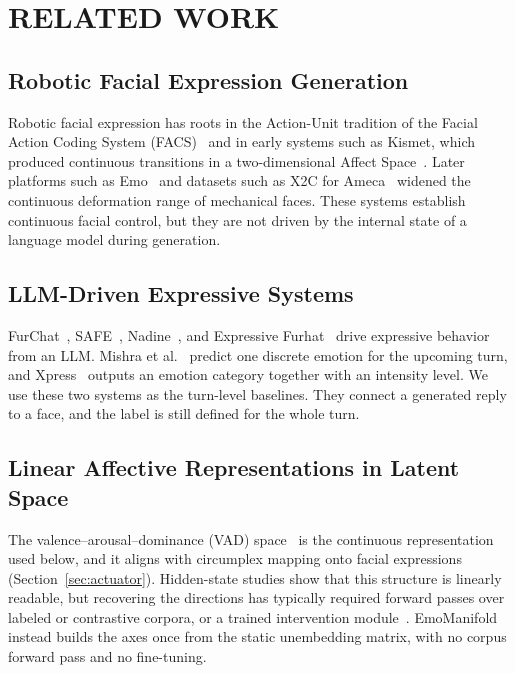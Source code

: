 \documentclass[letterpaper, 10 pt, conference]{ieeeconf/ieeeconf}
\begin{document}
\section{RELATED WORK}
\label{sec:related}

\subsection{Robotic Facial Expression Generation}
Robotic facial expression has roots in the Action-Unit tradition of the Facial Action Coding System (FACS)~\cite{ekman1978facs} and in early systems such as Kismet, which produced continuous transitions in a two-dimensional Affect Space~\cite{breazeal2002designing}. Later platforms such as Emo~\cite{hu2024emo} and datasets such as X2C for Ameca~\cite{li2025x2c} widened the continuous deformation range of mechanical faces. These systems establish continuous facial control, but they are not driven by the internal state of a language model during generation.

\subsection{LLM-Driven Expressive Systems}
FurChat~\cite{cherakara2023furchat}, SAFE~\cite{lee2023safe}, Nadine~\cite{kang2024nadine}, and Expressive Furhat~\cite{abbo2025expressive} drive expressive behavior from an LLM. Mishra et al.~\cite{mishra2023realtime} predict one discrete emotion for the upcoming turn, and Xpress~\cite{antony2025xpress} outputs an emotion category together with an intensity level. We use these two systems as the turn-level baselines. They connect a generated reply to a face, and the label is still defined for the whole turn.

\subsection{Linear Affective Representations in Latent Space}
The valence--arousal--dominance (VAD) space~\cite{russell1977evidence,mohammad2018nrcvad} is the continuous representation used below, and it aligns with circumplex mapping onto facial expressions (Section~\ref{sec:actuator}). Hidden-state studies show that this structure is linearly readable, but recovering the directions has typically required forward passes over labeled or contrastive corpora, or a trained intervention module~\cite{tigges2024sentiment,reichman2026emotions}. EmoManifold instead builds the axes once from the static unembedding matrix, with no corpus forward pass and no fine-tuning.
\end{document}
